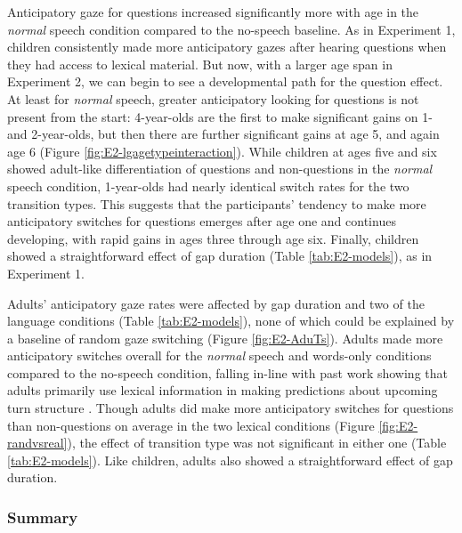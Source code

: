 \documentclass[authoryear, 12pt]{elsarticle}
\begin{document}
Anticipatory gaze for questions increased significantly more with age in the \textit{normal} speech condition compared to the no-speech baseline. As in Experiment 1, children consistently made more anticipatory gazes after hearing questions when they had access to lexical material. But now, with a larger age span in Experiment 2, we can begin to see a developmental path for the question effect. At least for \textit{normal} speech, greater anticipatory looking for questions is not present from the start: 4-year-olds are the first to make significant gains on 1- and 2-year-olds, but then there are further significant gains at age 5, and again age 6 (Figure \ref{fig:E2-lgagetypeinteraction}). While children at ages five and six showed adult-like differentiation of questions and non-questions in the \textit{normal} speech condition, 1-year-olds had nearly identical switch rates for the two transition types. This suggests that the participants' tendency to make more anticipatory switches for questions emerges after age one and continues developing, with rapid gains in ages three through age six. Finally, children showed a straightforward effect of gap duration (Table \ref{tab:E2-models}), as in Experiment 1.

Adults' anticipatory gaze rates were affected by gap duration and two of the language conditions (Table \ref{tab:E2-models}), none of which could be explained by a baseline of random gaze switching (Figure \ref{fig:E2-AduTs}). Adults made more anticipatory switches overall for the \textit{normal} speech and words-only conditions compared to the no-speech condition, falling in-line with past work showing that adults primarily use lexical information in making predictions about upcoming turn structure \citep{de-ruiter2006}. Though adults did make more anticipatory switches for questions than non-questions on average in the two lexical conditions (Figure \ref{fig:E2-randvsreal}), the effect of transition type was not significant in either one (Table \ref{tab:E2-models}). Like children, adults also showed a straightforward effect of gap duration.

\subsubsection{Summary}
\label{sec:summary2}
\end{document}

